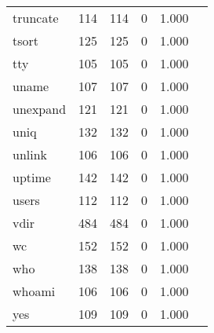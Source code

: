 \begin{longtable}{lp{2.4cm}p{2.4cm}p{2.4cm}p{2.4cm}p{2.4cm}}
truncate  &                                    114 &                             114 &                                0 &                                       1.000 \\
tsort     &                                    125 &                             125 &                                0 &                                       1.000 \\
tty       &                                    105 &                             105 &                                0 &                                       1.000 \\
uname     &                                    107 &                             107 &                                0 &                                       1.000 \\
unexpand  &                                    121 &                             121 &                                0 &                                       1.000 \\
uniq      &                                    132 &                             132 &                                0 &                                       1.000 \\
unlink    &                                    106 &                             106 &                                0 &                                       1.000 \\
uptime    &                                    142 &                             142 &                                0 &                                       1.000 \\
users     &                                    112 &                             112 &                                0 &                                       1.000 \\
vdir      &                                    484 &                             484 &                                0 &                                       1.000 \\
wc        &                                    152 &                             152 &                                0 &                                       1.000 \\
who       &                                    138 &                             138 &                                0 &                                       1.000 \\
whoami    &                                    106 &                             106 &                                0 &                                       1.000 \\
yes       &                                    109 &                             109 &                                0 &                                       1.000 \\
\end{longtable}
